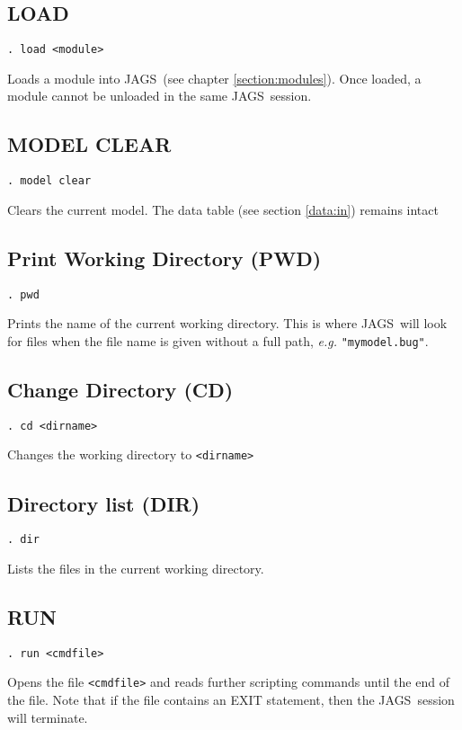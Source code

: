 \documentclass[11pt, a4paper, titlepage]{report}
\newcommand{\JAGS}{\textsf{JAGS}}
\begin{document}
\subsection{LOAD}
\label{load}
\begin{verbatim}
. load <module>
\end{verbatim}
Loads a module into \JAGS\ (see chapter \ref{section:modules}). Once
loaded, a module cannot be unloaded in the same \JAGS\ session.

\subsection{MODEL CLEAR}
\label{model:clear}
\begin{verbatim}
. model clear
\end{verbatim}
Clears the current model.  The data table (see section \ref{data:in})
remains intact

\subsection{Print Working Directory (PWD)}
\begin{verbatim}
. pwd
\end{verbatim}
Prints the name of the current working directory. This is where \JAGS\
will look for files when the file name is given without a full path, 
{\em e.g.} \verb+"mymodel.bug"+.

\subsection{Change Directory (CD)}
\begin{verbatim}
. cd <dirname>
\end{verbatim}
Changes the working directory to \texttt{<dirname>}

\subsection{Directory list (DIR)}
\begin{verbatim}
. dir
\end{verbatim}
Lists the files in the current working directory.

\subsection{RUN}
\begin{verbatim}
. run <cmdfile>
\end{verbatim}
Opens the file \texttt{<cmdfile>} and reads further scripting commands
until the end of the file.  Note that if the file contains an EXIT
statement, then the \JAGS\ session will terminate. 
\end{document}
